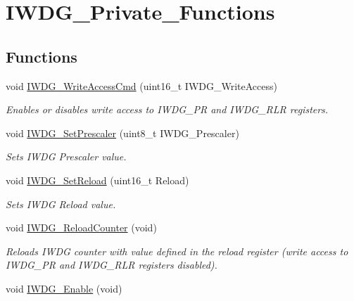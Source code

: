 \hypertarget{group___i_w_d_g___private___functions}{}\section{I\+W\+D\+G\+\_\+\+Private\+\_\+\+Functions}
\label{group___i_w_d_g___private___functions}
\subsection*{Functions}
\begin{DoxyCompactItemize}
\item 
void \mbox{\hyperlink{group___i_w_d_g___private___functions_gae466681e5bdc11b353c508b89d75ca05}{I\+W\+D\+G\+\_\+\+Write\+Access\+Cmd}} (uint16\+\_\+t I\+W\+D\+G\+\_\+\+Write\+Access)
\begin{DoxyCompactList}\small\item\em Enables or disables write access to I\+W\+D\+G\+\_\+\+PR and I\+W\+D\+G\+\_\+\+R\+LR registers. \end{DoxyCompactList}\item 
void \mbox{\hyperlink{group___i_w_d_g___private___functions_ga4fa7f1cd690533a35ad9e4729c0450a3}{I\+W\+D\+G\+\_\+\+Set\+Prescaler}} (uint8\+\_\+t I\+W\+D\+G\+\_\+\+Prescaler)
\begin{DoxyCompactList}\small\item\em Sets I\+W\+DG Prescaler value. \end{DoxyCompactList}\item 
void \mbox{\hyperlink{group___i_w_d_g___private___functions_gae2a14752a0431f23cb80cebf202ac365}{I\+W\+D\+G\+\_\+\+Set\+Reload}} (uint16\+\_\+t Reload)
\begin{DoxyCompactList}\small\item\em Sets I\+W\+DG Reload value. \end{DoxyCompactList}\item 
void \mbox{\hyperlink{group___i_w_d_g___private___functions_ga7147ebabdc3fef97f532b171a4e70d49}{I\+W\+D\+G\+\_\+\+Reload\+Counter}} (void)
\begin{DoxyCompactList}\small\item\em Reloads I\+W\+DG counter with value defined in the reload register (write access to I\+W\+D\+G\+\_\+\+PR and I\+W\+D\+G\+\_\+\+R\+LR registers disabled). \end{DoxyCompactList}\item 
void \mbox{\hyperlink{group___i_w_d_g___private___functions_ga479b2921c86f8c67b819f5c4bea6bdb6}{I\+W\+D\+G\+\_\+\+Enable}} (void)

\end{DoxyCompactItemize}
